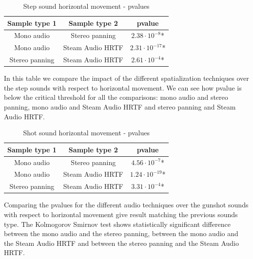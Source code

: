 \documentclass[conference]{IEEEtran}
\begin{document}
\begin{table}[htbp]
\caption{Step sound horizontal movement - pvalues}
\begin{center}
\begin{tabular}{|c|c|c|}
\hline
\textbf{Sample type 1} & \textbf{Sample type 2} & \textbf{pvalue}\\
\hline
Mono audio & Stereo panning & $2.38 \cdot 10^{-8}$*\\
\hline
Mono audio & Steam Audio HRTF & $2.31 \cdot 10^{-17}$*\\
\hline
Stereo panning & Steam Audio HRTF & $2.61 \cdot 10^{-4}$*\\
\hline
\end{tabular}
\label{tab21}
\end{center}
\end{table}

In this table we compare the impact of the different spatialization techniques over the step sounds with respect to horizontal movement. We can see how pvalue is below the critical threshold for all the comparisons: mono audio and stereo panning, mono audio and Steam Audio HRTF and stereo panning and Steam Audio HRTF.

\begin{table}[htbp]
\caption{Shot sound horizontal movement - pvalues}
\begin{center}
\begin{tabular}{|c|c|c|}
\hline
\textbf{Sample type 1} & \textbf{Sample type 2} & \textbf{pvalue}\\
\hline
Mono audio & Stereo panning & $4.56 \cdot 10^{-7}$*\\
\hline
Mono audio & Steam Audio HRTF & $1.24 \cdot 10^{-19}$*\\
\hline
Stereo panning & Steam Audio HRTF & $3.31 \cdot 10^{-4}$*\\
\hline
\end{tabular}
\label{tab31}
\end{center}
\end{table}

Comparing the pvalues for the different audio techniques over the gunshot sounds with respect to horizontal movement give result matching the previous sounds type. The Kolmogorov Smirnov test shows statistically significant difference between the mono audio and the stereo panning, between the mono audio and the Steam Audio HRTF and between the stereo panning and the Steam Audio HRTF.
\end{document}
